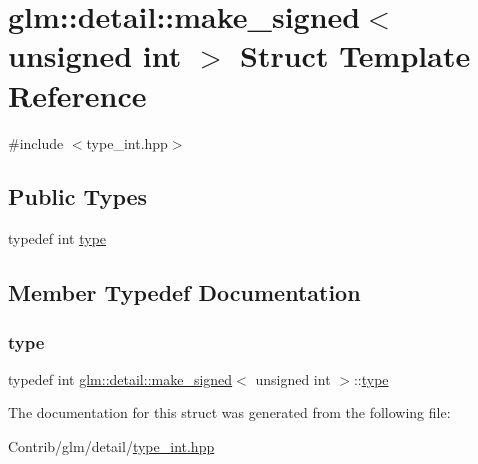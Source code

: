 \hypertarget{structglm_1_1detail_1_1make__signed_3_01unsigned_01int_01_4}{}\section{glm\+:\+:detail\+:\+:make\+\_\+signed$<$ unsigned int $>$ Struct Template Reference}
\label{structglm_1_1detail_1_1make__signed_3_01unsigned_01int_01_4}


{\ttfamily \#include $<$type\+\_\+int.\+hpp$>$}

\subsection*{Public Types}
\begin{DoxyCompactItemize}
\item 
typedef int \mbox{\hyperlink{structglm_1_1detail_1_1make__signed_3_01unsigned_01int_01_4_a78b4ada342bba40027f755d20eae141a}{type}}
\end{DoxyCompactItemize}


\subsection{Member Typedef Documentation}
\mbox{\label{structglm_1_1detail_1_1make__signed_3_01unsigned_01int_01_4_a78b4ada342bba40027f755d20eae141a}} 
\subsubsection{\texorpdfstring{type}{type}}
{\footnotesize\ttfamily typedef int \mbox{\hyperlink{structglm_1_1detail_1_1make__signed}{glm\+::detail\+::make\+\_\+signed}}$<$ unsigned int $>$\+::\mbox{\hyperlink{structglm_1_1detail_1_1make__signed_3_01unsigned_01int_01_4_a78b4ada342bba40027f755d20eae141a}{type}}}



The documentation for this struct was generated from the following file\+:\begin{DoxyCompactItemize}
\item 
Contrib/glm/detail/\mbox{\hyperlink{type__int_8hpp}{type\+\_\+int.\+hpp}}\end{DoxyCompactItemize}
